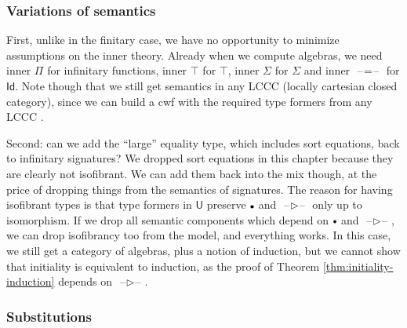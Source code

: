 \documentclass[12pt,a4paper,twoside,openany]{book}
\theoremstyle{remark}
\theoremstyle{definition}
\theoremstyle{theorem}
\newcommand{\Con}{\mathsf{Con}}
\newcommand{\U}{\mathsf{U}}
\newcommand{\Id}{\mathsf{Id}}
\newcommand{\blank}{\mathord{\hspace{1pt}\text{--}\hspace{1pt}}}
\newcommand{\ext}{\triangleright}
\newcommand{\emptycon}{\scaleobj{.75}\bullet}
\begin{document}
\subsubsection{Variations of semantics}

First, unlike in the finitary case, we have no opportunity to minimize
assumptions on the inner theory. Already when we compute algebras, we need inner
$\Pi$ for infinitary functions, inner $\top$ for $\top$, inner $\Sigma$ for
$\Sigma$ and inner $\blank\!=\!\blank$ for $\Id$. Note though that we still get
semantics in any LCCC (locally cartesian closed category), since we can build a
cwf with the required type formers from any LCCC
\cite{clairambault2014biequivalence}.

Second: can we add the ``large'' equality type, which includes sort equations,
back to infinitary signatures? We dropped sort equations in this chapter because
they are clearly not isofibrant. We can add them back into the mix though, at
the price of dropping things from the semantics of signatures. The reason for
having isofibrant types is that type formers in $\U$ preserve $\emptycon$ and
$\blank\!\ext\!\blank$ only up to isomorphism. If we drop all semantic
components which depend on $\emptycon$ and $\blank\!\ext\!\blank$, we can drop
isofibrancy too from the model, and everything works. In this case, we still get
a category of algebras, plus a notion of induction, but we cannot show that
initiality is equivalent to induction, as the proof of Theorem
\ref{thm:initiality-induction} depends on $\blank\!\ext\!\blank$.


\subsubsection{Substitutions}


\end{document}
